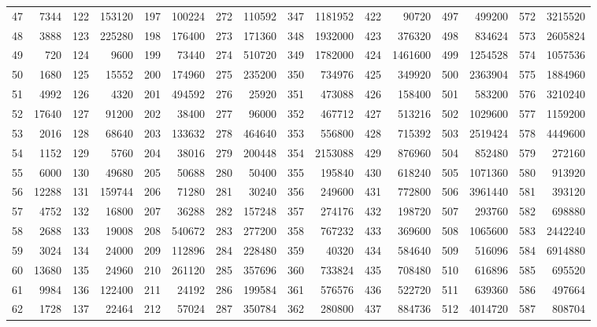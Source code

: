 \documentclass[11pt]{amsart}
\theoremstyle{remark}
\theoremstyle{plain}
\numberwithin{equation}{section}
\renewcommand{\(}{\left(}
\renewcommand{\)}{\right)}
\begin{document}
{\begin{table}
\begin{tabular}{|lr|lr|lr|lr|lr|lr|lr|lr|}
   47 & 7344 &  122 & 153120 &  197 & 100224 &  272 & 110592 &  347 & 1181952 &  422 & 90720 &  497 & 499200 &  572 & 3215520 \\
   48 & 3888 &  123 & 225280 &  198 & 176400 &  273 & 171360 &  348 & 1932000 &  423 & 376320 &  498 & 834624 &  573 & 2605824 \\
   49 & 720 &  124 & 9600 &  199 & 73440 &  274 & 510720 &  349 & 1782000 &  424 & 1461600 &  499 & 1254528 &  574 & 1057536 \\
   50 & 1680 &  125 & 15552 &  200 & 174960 &  275 & 235200 &  350 & 734976 &  425 & 349920 &  500 & 2363904 &  575 & 1884960 \\
   51 & 4992 &  126 & 4320 &  201 & 494592 &  276 & 25920 &  351 & 473088 &  426 & 158400 &  501 & 583200 &  576 & 3210240 \\
   52 & 17640 &  127 & 91200 &  202 & 38400 &  277 & 96000 &  352 & 467712 &  427 & 513216 &  502 & 1029600 &  577 & 1159200 \\
   53 & 2016 &  128 & 68640 &  203 & 133632 &  278 & 464640 &  353 & 556800 &  428 & 715392 &  503 & 2519424 &  578 & 4449600 \\
   54 & 1152 &  129 & 5760 &  204 & 38016 &  279 & 200448 &  354 & 2153088 &  429 & 876960 &  504 & 852480 &  579 & 272160 \\
   55 & 6000 &  130 & 49680 &  205 & 50688 &  280 & 50400 &  355 & 195840 &  430 & 618240 &  505 & 1071360 &  580 & 913920 \\
   56 & 12288 &  131 & 159744 &  206 & 71280 &  281 & 30240 &  356 & 249600 &  431 & 772800 &  506 & 3961440 &  581 & 393120 \\
   57 & 4752 &  132 & 16800 &  207 & 36288 &  282 & 157248 &  357 & 274176 &  432 & 198720 &  507 & 293760 &  582 & 698880 \\
   58 & 2688 &  133 & 19008 &  208 & 540672 &  283 & 277200 &  358 & 767232 &  433 & 369600 &  508 & 1065600 &  583 & 2442240 \\
   59 & 3024 &  134 & 24000 &  209 & 112896 &  284 & 228480 &  359 & 40320 &  434 & 584640 &  509 & 516096 &  584 & 6914880 \\
   60 & 13680 &  135 & 24960 &  210 & 261120 &  285 & 357696 &  360 & 733824 &  435 & 708480 &  510 & 616896 &  585 & 695520 \\
   61 & 9984 &  136 & 122400 &  211 & 24192 &  286 & 199584 &  361 & 576576 &  436 & 522720 &  511 & 639360 &  586 & 497664 \\
   62 & 1728 &  137 & 22464 &  212 & 57024 &  287 & 350784 &  362 & 280800 &  437 & 884736 &  512 & 4014720 &  587 & 808704 \\

\end{tabular}
\end{table}}
\end{document}
